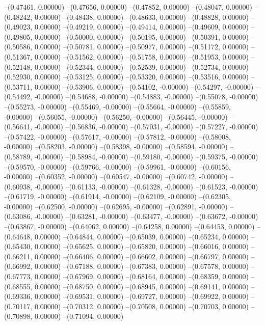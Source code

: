 --(0.47461, 0.00000)
--(0.47656, 0.00000)
--(0.47852, 0.00000)
--(0.48047, 0.00000)
--(0.48242, 0.00000)
--(0.48438, 0.00000)
--(0.48633, 0.00000)
--(0.48828, 0.00000)
--(0.49023, 0.00000)
--(0.49219, 0.00000)
--(0.49414, 0.00000)
--(0.49609, 0.00000)
--(0.49805, 0.00000)
--(0.50000, 0.00000)
--(0.50195, 0.00000)
--(0.50391, 0.00000)
--(0.50586, 0.00000)
--(0.50781, 0.00000)
--(0.50977, 0.00000)
--(0.51172, 0.00000)
--(0.51367, 0.00000)
--(0.51562, 0.00000)
--(0.51758, 0.00000)
--(0.51953, 0.00000)
--(0.52148, 0.00000)
--(0.52344, 0.00000)
--(0.52539, 0.00000)
--(0.52734, 0.00000)
--(0.52930, 0.00000)
--(0.53125, 0.00000)
--(0.53320, 0.00000)
--(0.53516, 0.00000)
--(0.53711, 0.00000)
--(0.53906, 0.00000)
--(0.54102, -0.00000)
--(0.54297, -0.00000)
--(0.54492, -0.00000)
--(0.54688, -0.00000)
--(0.54883, -0.00000)
--(0.55078, -0.00000)
--(0.55273, -0.00000)
--(0.55469, -0.00000)
--(0.55664, -0.00000)
--(0.55859, -0.00000)
--(0.56055, -0.00000)
--(0.56250, -0.00000)
--(0.56445, -0.00000)
--(0.56641, -0.00000)
--(0.56836, -0.00000)
--(0.57031, -0.00000)
--(0.57227, -0.00000)
--(0.57422, -0.00000)
--(0.57617, -0.00000)
--(0.57812, -0.00000)
--(0.58008, -0.00000)
--(0.58203, -0.00000)
--(0.58398, -0.00000)
--(0.58594, -0.00000)
--(0.58789, -0.00000)
--(0.58984, -0.00000)
--(0.59180, -0.00000)
--(0.59375, -0.00000)
--(0.59570, -0.00000)
--(0.59766, -0.00000)
--(0.59961, -0.00000)
--(0.60156, -0.00000)
--(0.60352, -0.00000)
--(0.60547, -0.00000)
--(0.60742, -0.00000)
--(0.60938, -0.00000)
--(0.61133, -0.00000)
--(0.61328, -0.00000)
--(0.61523, -0.00000)
--(0.61719, -0.00000)
--(0.61914, -0.00000)
--(0.62109, -0.00000)
--(0.62305, -0.00000)
--(0.62500, -0.00000)
--(0.62695, -0.00000)
--(0.62891, -0.00000)
--(0.63086, -0.00000)
--(0.63281, -0.00000)
--(0.63477, -0.00000)
--(0.63672, -0.00000)
--(0.63867, -0.00000)
--(0.64062, 0.00000)
--(0.64258, 0.00000)
--(0.64453, 0.00000)
--(0.64648, 0.00000)
--(0.64844, 0.00000)
--(0.65039, 0.00000)
--(0.65234, 0.00000)
--(0.65430, 0.00000)
--(0.65625, 0.00000)
--(0.65820, 0.00000)
--(0.66016, 0.00000)
--(0.66211, 0.00000)
--(0.66406, 0.00000)
--(0.66602, 0.00000)
--(0.66797, 0.00000)
--(0.66992, 0.00000)
--(0.67188, 0.00000)
--(0.67383, 0.00000)
--(0.67578, 0.00000)
--(0.67773, 0.00000)
--(0.67969, 0.00000)
--(0.68164, 0.00000)
--(0.68359, 0.00000)
--(0.68555, 0.00000)
--(0.68750, 0.00000)
--(0.68945, 0.00000)
--(0.69141, 0.00000)
--(0.69336, 0.00000)
--(0.69531, 0.00000)
--(0.69727, 0.00000)
--(0.69922, 0.00000)
--(0.70117, 0.00000)
--(0.70312, 0.00000)
--(0.70508, 0.00000)
--(0.70703, 0.00000)
--(0.70898, 0.00000)
--(0.71094, 0.00000)
